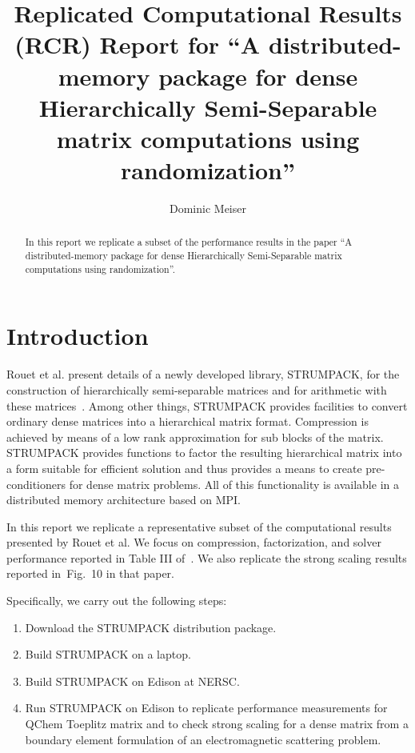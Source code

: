 \documentclass{acmsmall}
\begin{document}
\title{Replicated Computational Results (RCR) Report for
  ``A distributed-memory package for dense Hierarchically
    Semi-Separable matrix computations using randomization''}

\author{Dominic Meiser
}

\newcommand{\strumpack}{STRUMPACK}

\begin{abstract}
  In this report we replicate a subset of the performance results
  in the paper ``A distributed-memory package for dense
  Hierarchically Semi-Separable matrix computations using
  randomization''.
\end{abstract}

\maketitle 

\section{Introduction}

Rouet et al. present details of a newly developed library,
\strumpack{}, for the construction of hierarchically
semi-separable matrices and for arithmetic with these
matrices~\cite{rouet:strumpack}.  Among other things,
\strumpack{} provides facilities to convert ordinary dense
matrices into a hierarchical matrix format.  Compression is
achieved by means of a low rank approximation for sub blocks of
the matrix.  \strumpack{} provides functions to factor the
resulting hierarchical matrix into a form suitable for efficient
solution and thus provides a means to create pre-conditioners for
dense matrix problems.  All of this functionality is available in
a distributed memory architecture based on MPI.

In this report we replicate a representative subset of the
computational results presented by Rouet et al.  We focus on
compression, factorization, and solver performance reported in
Table III of~\cite{rouet:strumpack}.  We also replicate the
strong scaling results reported in~Fig.~10
in that paper.

Specifically, we carry out the following steps:
\begin{enumerate}
  \item Download the \strumpack{} distribution package.
  \item Build \strumpack{} on a laptop.
  \item Build \strumpack{} on Edison at NERSC.
  \item Run \strumpack{} on Edison to replicate performance
    measurements for QChem Toeplitz matrix and to check strong
    scaling for a dense matrix from a boundary element formulation
    of an electromagnetic scattering problem.
\end{enumerate}
\end{document}
